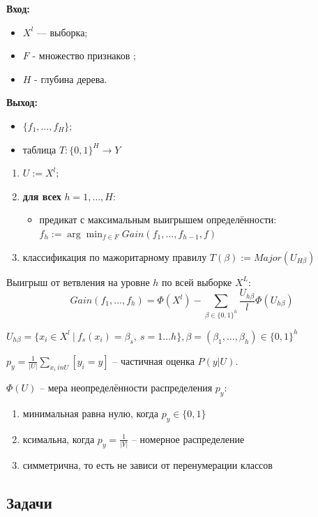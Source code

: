 \hline
\textbf{Вход:}
\begin{itemize}
    \item $X^l$ — выборка;
    \item $F$ - множество признаков ;
    \item $H$ - глубина дерева.
\end{itemize}

\textbf{Выход:}
\begin{itemize}
    \item $\{f_1, \dots, f_H\};$ 
    \item таблица $T: \{0, 1\}^H \xrightarrow{} Y$
\end{itemize}

\hline
\begin{enumerate}
    \item $U := X^l;$
    \item \textbf{для всех} $h = 1, \dots, H$:
    \begin{itemize}
        \item предикат с максимальным выигрышем определённости:
        $f_h := \arg\min_{f \in F} Gain(f_1, \dots, f_{h-1}, f)$
    \end{itemize}
    \item классификация по мажоритарному правилу 
    $ T(\beta) := Major(U_{H\beta}) $
\end{enumerate}
\hline
Выигрыш от ветвления на уровне $h$ по всей выборке $X^L$:
$$Gain(f_1, \dots, f_h) = \Phi(X^l) - \sum_{\beta\in \{0, 1\}^h} \frac{U_{h\beta}}{l}\Phi(U_{h\beta})$$

$U_{h\beta} = \{ x_i \in X^l \ | \ f_s(x_i)=\beta_s,\ s=1\dots h \}, \beta=(\beta_1, \dots, \beta_h) \in \{0, 1\}^h$

$p_y =\frac{1}{|U|} \sum_{x_i \ in U}[y_i = y]$ -- частичная оценка $P(y|U)$.

$\Phi(U)$ -- мера неопределённости распределения $p_y$:
\begin{enumerate}
    \item минимальная  равна нулю, когда $p_y \in \{0,1\}$
    \item ксимальна, когда $p_y = \frac{1}{|Y|}$ -- номерное распределение
    \item симметрична, то есть не зависи от перенумерации классов
\end{enumerate}

\subsection{Задачи}

